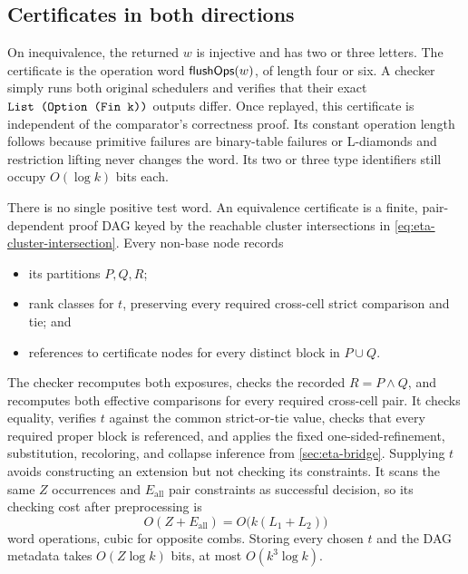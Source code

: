 \subsection{Certificates in both directions}

On inequivalence, the returned \(w\) is injective and has two or three
letters.  The certificate is the operation word \(\mathsf{flushOps}(w)\), of length
four or six.  A checker simply runs both original schedulers and verifies that
their exact \(\texttt{List (Option (Fin k))}\) outputs differ.  Once replayed,
this certificate is independent of the comparator's correctness proof.  Its
constant operation length follows because primitive failures are binary-table
failures or L-diamonds and restriction lifting never changes the word.  Its
two or three type identifiers still occupy \(O(\log k)\) bits each.

There is no single positive test word.  An equivalence certificate is a
finite, pair-dependent proof DAG keyed by the reachable cluster intersections
in \autoref{eq:eta-cluster-intersection}.  Every non-base node records
\begin{itemize}
\item its partitions \(P,Q,R\);
\item rank classes for \(t\), preserving every required cross-cell strict
      comparison and tie; and
\item references to certificate nodes for every distinct block in
      \(P\cup Q\).
\end{itemize}
The checker recomputes both exposures, checks the recorded
\(R=P\wedge Q\), and recomputes both effective comparisons for every required
cross-cell pair.  It checks equality, verifies \(t\) against the common
strict-or-tie value, checks that every required proper block is referenced,
and applies the fixed
one-sided-refinement, substitution, recoloring, and collapse inference from
\autoref{sec:eta-bridge}.  Supplying \(t\) avoids constructing an extension but
not checking its constraints.  It scans the same \(Z\) occurrences and
\(E_{\mathrm{all}}\) pair constraints as successful decision, so its checking
cost after preprocessing is
\begin{equation}
 O(Z+E_{\mathrm{all}})=O\bigl(k(L_1+L_2)\bigr)
 \label{eq:eta-certificate-check}
\end{equation}
word operations, cubic for opposite combs.  Storing every chosen \(t\) and
the DAG metadata takes \(O(Z\log k)\) bits, at most \(O(k^3\log k)\).

